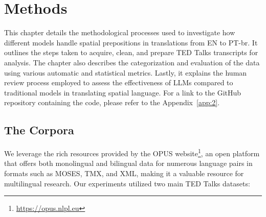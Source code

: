 \chapter{Methods}
\label{cap:Methods}

This chapter details the methodological processes used to investigate how different models handle spatial prepositions in translations from EN to PT-br. It outlines the steps taken to acquire, clean, and prepare TED Talks transcripts for analysis. The chapter also describes the categorization and evaluation of the data using various automatic and statistical metrics. Lastly, it explains the human review process employed to assess the effectiveness of LLMs compared to traditional models in translating spatial language. For a link to the GitHub repository containing the code, please refer to the Appendix~\ref{app:2}.


\section{The Corpora}

We leverage the rich resources provided by the OPUS website\footnote{\href{https://opus.nlpl.eu}{https://opus.nlpl.eu}}, an open platform that offers both monolingual and bilingual data for numerous language pairs in formats such as MOSES, TMX, and XML, making it a valuable resource for multilingual research. Our experiments utilized two main TED Talks datasets:

